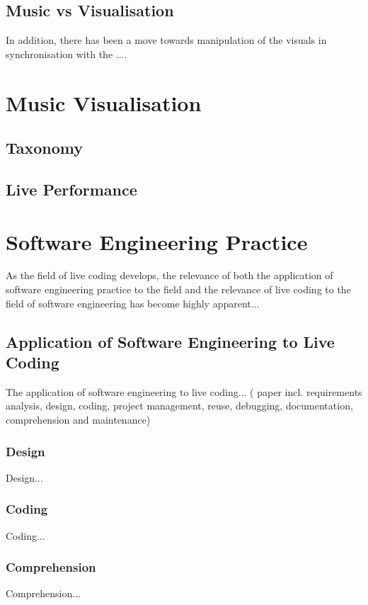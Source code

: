 \subsection{Music vs Visualisation}

In addition, there has been a move towards manipulation of the visuals in synchronisation with the ....


\section{Music Visualisation}
\label{sec:musicvisualisation}

\subsection{Taxonomy}

\subsection{Live Performance}


\section{Software Engineering Practice}
\label{sec:softwareengineering}

As the field of live coding develops, the relevance of both the application of software engineering practice to the field and the relevance of live coding to the field of software engineering has become highly apparent...

\subsection{Application of Software Engineering to Live Coding}
The application of software engineering to live coding...
(\cite{Blackwell2005} paper incl. requirements analysis, design, coding, project management, reuse, debugging, documentation, comprehension and maintenance)

\subsubsection{Design}
Design...
\subsubsection{Coding}
Coding...
\subsubsection{Comprehension}
Comprehension...

